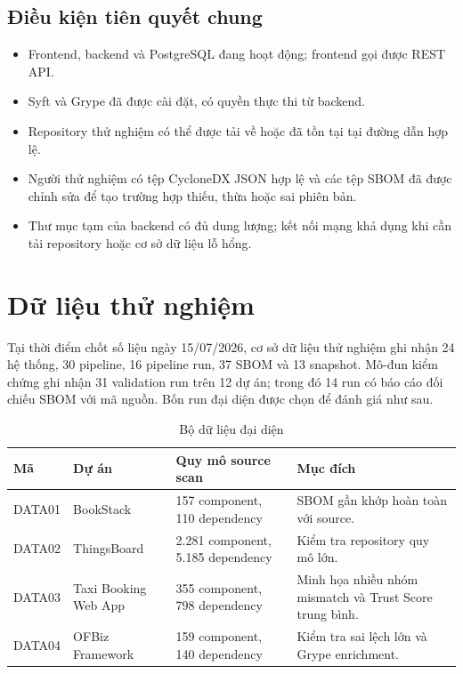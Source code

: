 \documentclass[12pt,a4paper]{article}
\begin{document}
\subsection{Điều kiện tiên quyết chung}

\begin{itemize}
  \item Frontend, backend và PostgreSQL đang hoạt động; frontend gọi được REST API.
  \item Syft và Grype đã được cài đặt, có quyền thực thi từ backend.
  \item Repository thử nghiệm có thể được tải về hoặc đã tồn tại tại đường dẫn hợp lệ.
  \item Người thử nghiệm có tệp CycloneDX JSON hợp lệ và các tệp SBOM đã được chỉnh sửa
        để tạo trường hợp thiếu, thừa hoặc sai phiên bản.
  \item Thư mục tạm của backend có đủ dung lượng; kết nối mạng khả dụng khi cần tải
        repository hoặc cơ sở dữ liệu lỗ hổng.
\end{itemize}

\section{Dữ liệu thử nghiệm}

Tại thời điểm chốt số liệu ngày 15/07/2026, cơ sở dữ liệu thử nghiệm ghi nhận
24 hệ thống, 30 pipeline, 16 pipeline run, 37 SBOM và 13 snapshot. Mô-đun kiểm
chứng ghi nhận 31 validation run trên 12 dự án; trong đó 14 run có báo cáo đối
chiếu SBOM với mã nguồn. Bốn run đại diện được chọn để đánh giá như sau.

\begin{table}[H]
  \centering
  \caption{Bộ dữ liệu đại diện}
  \begin{tabularx}{\textwidth}{|C{1.6cm}|L{3.5cm}|C{3.4cm}|Y|}
    \hline
    \textbf{Mã} & \textbf{Dự án} & \textbf{Quy mô source scan} & \textbf{Mục đích} \\ \hline
    DATA01 & BookStack & 157 component, 110 dependency & SBOM gần khớp hoàn toàn với source. \\ \hline
    DATA02 & ThingsBoard & 2.281 component, 5.185 dependency & Kiểm tra repository quy mô lớn. \\ \hline
    DATA03 & Taxi Booking Web App & 355 component, 798 dependency & Minh họa nhiều nhóm mismatch và Trust Score trung bình. \\ \hline
    DATA04 & OFBiz Framework & 159 component, 140 dependency & Kiểm tra sai lệch lớn và Grype enrichment. \\ \hline
  \end{tabularx}
\end{table}
\end{document}
